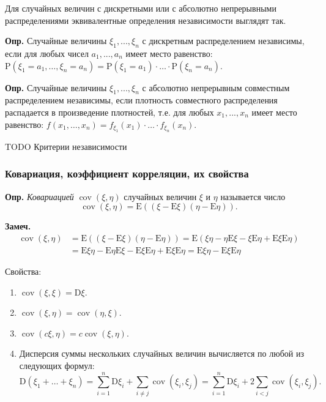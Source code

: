 \documentclass[oneside,final,14pt]{extreport}
\newcommand\mydef{{\bf Опр.}}
\newcommand\mynote{{\bf Замеч.}}
\theoremstyle{definition}
\begin{document}
Для случайных величин с дискретными или с абсолютно непрерывными
распределениями эквивалентные определения независимости выглядят так.

\mydef{} Случайные величины $\xi_1, ..., \xi_n$ с дискретным распределением независимы, если для любых чисел $a_1, ..., a_n$ имеет место равенство: $\mathrm{P}\left(\xi_{1}=a_{1}, \ldots, \xi_{n}=a_{n}\right)=\mathrm{P}\left(\xi_{1}=a_{1}\right) \cdot \ldots \cdot \mathrm{P}\left(\xi_{n}=a_{n}\right)$.

\mydef{} Случайные величины $\xi_1, ..., \xi_n$ с абсолютно непрерывным совместным распределением независимы, если плотность совместного распределения распадается в произведение плотностей, т.е. для любых $x_1, ..., x_n$ имеет место равенство: $f\left(x_{1}, \ldots, x_{n}\right)=f_{\xi_{1}}\left(x_{1}\right) \cdot \ldots \cdot f_{\xi_{n}}\left(x_{n}\right)$.

TODO Критерии независимости

\subsubsection{Ковариация, коэффициент корреляции, их свойства}

\mydef{} {\it Ковариацией} $\operatorname{cov}(\xi,\eta)$ случайных величин $\xi$ и $\eta$ называется число $$\operatorname{cov}(\xi,\eta)=\mathrm{E}((\xi-\mathrm{E} \xi)(\eta-\mathrm{E} \eta)).$$

\mynote{} $$\begin{aligned} \operatorname{cov}(\xi, \eta) &=\mathrm{E}((\xi-\mathrm{E} \xi)(\eta-\mathrm{E} \eta))=\mathrm{E}(\xi \eta-\eta \mathrm{E} \xi-\xi \mathrm{E} \eta+\mathrm{E} \xi \mathrm{E} \eta) \\ &=\mathrm{E} \xi \eta-\mathrm{E} \eta \mathrm{E} \xi-\mathrm{E} \xi \mathrm{E} \eta+\mathrm{E} \xi \mathrm{E} \eta=\mathrm{E} \xi \eta-\mathrm{E} \xi \mathrm{E} \eta \end{aligned}$$

Свойства:

\begin{enumerate}
    \item $\operatorname{cov}(\xi, \xi)=\mathrm{D} \xi.$
    \item $\operatorname{cov}(\xi, \eta)=\operatorname{cov}(\eta, \xi).$
    \item $\operatorname{cov}(c \xi, \eta)=c \operatorname{cov}(\xi, \eta).$
    \item Дисперсия суммы нескольких случайных величин вычисляется по любой из следующих формул:
    $$\mathrm{D}\left(\xi_{1}+\ldots+\xi_{n}\right)=\sum_{i=1}^{n} \mathrm{D} \xi_{i}+\sum_{i \neq j} \operatorname{cov}\left(\xi_{i}, \xi_{j}\right)=\sum_{i=1}^{n} \mathrm{D} \xi_{i}+2 \sum_{i<j} \operatorname{cov}\left(\xi_{i}, \xi_{j}\right).$$
\end{enumerate}
\end{document}
